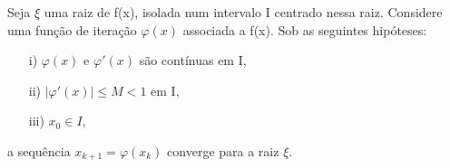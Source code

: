 \begin{teo}
    Seja $\xi$ uma raiz de f(x), isolada num intervalo I centrado nessa raiz. Considere uma função de iteração $\varphi(x)$ associada a f(x). Sob as seguintes hipóteses:
    \begin{itemize}\label{teoMPF}
        \item[i)] $\varphi(x)$ e $\varphi'(x)$ são contínuas em I,
        \item [ii)] $|\varphi'(x)| \leq M < 1$ em I,
        \item [iii)] $x_0 \in I$,
    \end{itemize}
    a sequência $x_{k+1} = \varphi(x_k)$ converge para a raiz $\xi$. 
\end{teo}
